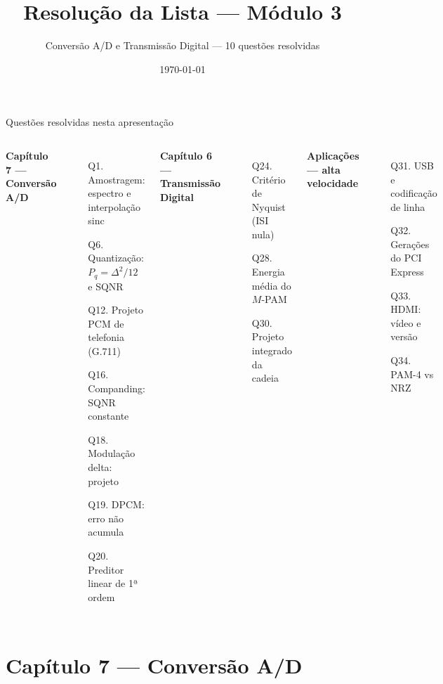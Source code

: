 \documentclass[aspectratio=169]{beamer}
\title{Resolução da Lista --- Módulo 3}
\subtitle{Conversão A/D e Transmissão Digital --- 10 questões resolvidas}
\author{\autorNome}
\institute{\institutoFinal}
\date{\today}
\begin{document}
\begin{frame}\titlepage\end{frame}

\begin{frame}{Questões resolvidas nesta apresentação}
  \small
  \begin{columns}[T]
    \textbf{Capítulo 7 --- Conversão A/D}
    \begin{enumerate}
      \item[Q1.] Amostragem: espectro e interpolação sinc
      \item[Q6.] Quantização: $P_q=\Delta^2/12$ e SQNR
      \item[Q12.] Projeto PCM de telefonia (G.711)
      \item[Q16.] Companding: SQNR constante
      \item[Q18.] Modulação delta: projeto
      \item[Q19.] DPCM: erro não acumula
      \item[Q20.] Preditor linear de 1ª ordem
    \end{enumerate}
    \textbf{Capítulo 6 --- Transmissão Digital}
    \begin{enumerate}
      \item[Q24.] Critério de Nyquist (ISI nula)
      \item[Q28.] Energia média do $M$-PAM
      \item[Q30.] Projeto integrado da cadeia
    \end{enumerate}
    \vspace{0.25cm}
    \textbf{Aplicações --- alta velocidade}
    \begin{enumerate}
      \item[Q31.] USB e codificação de linha
      \item[Q32.] Gerações do PCI Express
      \item[Q33.] HDMI: vídeo e versão
      \item[Q34.] PAM-4 vs NRZ
    \end{enumerate}
  \end{columns}
\end{frame}

\section{Capítulo 7 --- Conversão A/D}
\end{document}
